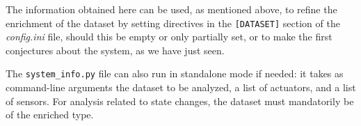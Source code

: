 	
		
	
	

The information obtained here can be used, as mentioned above, to refine the enrichment of the dataset by setting directives in the \texttt{[DATASET]} section of the \textit{config.ini} file, should this be empty or only partially set, or to make the first conjectures about the system, as we have just seen.

\bigskip
The \texttt{system\_info.py} file can also run in standalone mode if needed: it takes as command-line arguments the dataset to be analyzed, a list of actuators, and a list of sensors. For analysis related to state changes, the dataset must mandatorily be of the enriched type.

